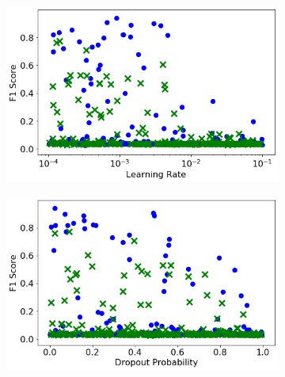 \begin{figure}[H]
     \centering
     \begin{subfigure}[b]{0.49\textwidth}
         \centering
         \includegraphics[width=\textwidth]{images/dnn_learning_rate.png}
         \caption{}
         \label{fig:dnn_learning_rate}
     \end{subfigure}
     \hfill
     \begin{subfigure}[b]{0.49\textwidth}
         \centering
         \includegraphics[width=\textwidth]{images/dnn_dropout.png}
         \caption{}
         \label{fig:dnn_dropout}
     \end{subfigure}


\end{figure}
